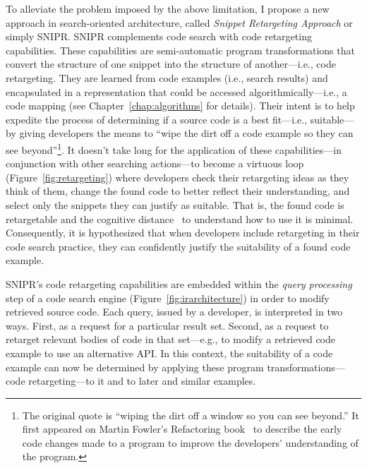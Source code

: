 To alleviate the problem imposed by the above limitation, I propose a new approach in search-oriented architecture, called \emph{Snippet Retargeting Approach} or simply \uppercase{SnipR}. \uppercase{SnipR} complements code search with code retargeting capabilities. These capabilities are semi-automatic program transformations that convert the structure of one snippet into the structure of another---i.e., code retargeting. They are learned from code examples (i.e., search results) and encapsulated in a representation that could be accessed algorithmically---i.e., a code mapping (see Chapter~\ref{chap:algorithms} for details). Their intent is to help expedite the process of determining if a source code is a best fit---i.e., suitable---by giving developers the means to ``wipe the dirt off a code example so they can see beyond''\footnote{The original quote is ``wiping the dirt off a window so you can see beyond.'' It first appeared on Martin Fowler's Refactoring book~\cite{Fowler:1999vp} to describe the early code changes made to a program to improve the developers' understanding of the program.}. It doesn’t take long for the application of these capabilities---in conjunction with other searching actions---to become a virtuous loop (Figure~\ref{fig:retargeting}) where developers check their retargeting ideas as they think of them, change the found code to better reflect their understanding, and select only the snippets they can justify as suitable. That is, the found code is retargetable and the cognitive distance~\cite{Krueger:1992wf} to understand how to use it is minimal. Consequently, it is hypothesized that when developers include retargeting in their code search practice, they can confidently justify the suitability of a found code example.     

\uppercase{SnipR}'s code retargeting capabilities are embedded within the \emph{query processing} step of a code search engine (Figure~\ref{fig:irarchitecture}) in order to modify retrieved source code. Each query, issued by a developer, is interpreted in two ways. First, as a request for a particular result set. Second, as a request to retarget relevant bodies of code in that set---e.g., to modify a retrieved code example to use an alternative API. In this context, the suitability of a code example can now be determined by applying these program transformations---code retargeting---to it and to later and similar examples. 

